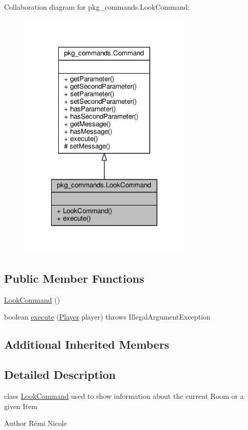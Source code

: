 Collaboration diagram for pkg\-\_\-commands.\-Look\-Command\-:
\nopagebreak
\begin{figure}[H]
\begin{center}
\leavevmode
\includegraphics[width=234pt]{classpkg__commands_1_1LookCommand__coll__graph}
\end{center}
\end{figure}
\subsection*{Public Member Functions}
\begin{DoxyCompactItemize}
\item 
\hyperlink{classpkg__commands_1_1LookCommand_ab689f51a18ea2d40ab995099e076112c}{Look\-Command} ()
\item 
boolean \hyperlink{classpkg__commands_1_1LookCommand_af336146fae1e14bf434d85a5acbcdcd7}{execute} (\hyperlink{classpkg__world_1_1Player}{Player} player)  throws Illegal\-Argument\-Exception 
\end{DoxyCompactItemize}
\subsection*{Additional Inherited Members}


\subsection{Detailed Description}
class \hyperlink{classpkg__commands_1_1LookCommand}{Look\-Command} used to show information about the current Room or a given Item \begin{DoxyAuthor}{Author}
Rémi Nicole 
\end{DoxyAuthor}


